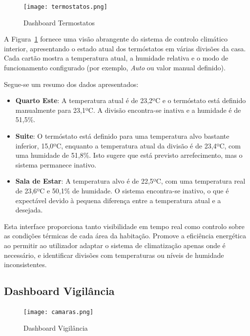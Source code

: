 \begin{figure}[H]
    \centering
    \texttt{[image: termostatos.png]}
    \caption{Dashboard Termostatos}
    \label{fig:termostatos.png}
\end{figure}

A Figura~\ref{fig:termostatos.png} fornece uma visão abrangente do sistema de controlo climático interior, apresentando o estado atual dos termóstatos em várias divisões da casa. Cada cartão mostra a temperatura atual, a humidade relativa e o modo de funcionamento configurado (por exemplo, \textit{Auto} ou valor manual definido).

Segue-se um resumo dos dados apresentados:

\begin{itemize}
    \item \textbf{Quarto Este}: A temperatura atual é de 23,2ºC e o termóstato está definido manualmente para 23,1ºC. A divisão encontra-se inativa e a humidade é de 51,5\%.
    
    \item \textbf{Suite}: O termóstato está definido para uma temperatura alvo bastante inferior, 15,0ºC, enquanto a temperatura atual da divisão é de 23,4ºC, com uma humidade de 51,8\%. Isto sugere que está previsto arrefecimento, mas o sistema permanece inativo.
    
    \item \textbf{Sala de Estar}: A temperatura alvo é de 22,5ºC, com uma temperatura real de 23,6ºC e 50,1\% de humidade. O sistema encontra-se inativo, o que é expectável devido à pequena diferença entre a temperatura atual e a desejada.
\end{itemize}

Esta interface proporciona tanto visibilidade em tempo real como controlo sobre as condições térmicas de cada área da habitação. Promove a eficiência energética ao permitir ao utilizador adaptar o sistema de climatização apenas onde é necessário, e identificar divisões com temperaturas ou níveis de humidade inconsistentes.


\subsection{Dashboard Vigilância}

\begin{figure}[H]
    \centering
    \texttt{[image: camaras.png]}
    \caption{Dashboard Vigilância}
    \label{fig:camaras.png}
\end{figure}


